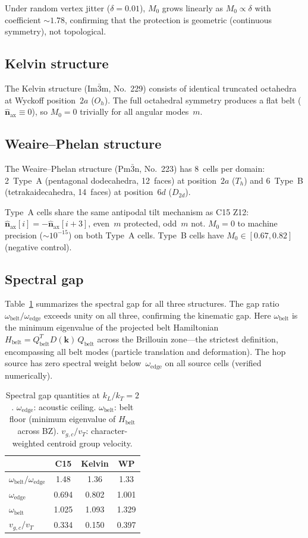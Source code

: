 \documentclass[12pt]{article}
\newcommand{\vk}{\bm{k}}
\newcommand{\vn}{\hat{\bm{n}}}
\newcommand{\oedge}{\omega_{\mathrm{edge}}}
\newcommand{\obelt}{\omega_{\mathrm{belt}}}
\begin{document}
Under random vertex jitter ($\delta = 0.01$), $M_0$ grows linearly as
$M_0 \propto \delta$ with coefficient $\sim\!1.78$, confirming that
the protection is geometric (continuous symmetry), not topological.

\subsection{Kelvin structure}
\label{sec:kelvin}

The Kelvin structure (Im$\bar{3}$m, No.~229) consists of identical
truncated octahedra at Wyckoff position~$2a$ ($O_h$).  The full
octahedral symmetry produces a flat belt ($\vn_{\mathrm{ax}} \equiv
0$), so $M_0 = 0$ trivially for all angular modes~$m$.

\subsection{Weaire--Phelan structure}
\label{sec:wp}

The Weaire--Phelan structure (Pm$\bar{3}$n, No.~223) has 8~cells per
domain: 2~Type~A (pentagonal dodecahedra, 12~faces) at
position~$2a$ ($T_h$) and 6~Type~B (tetrakaidecahedra, 14~faces) at
position~$6d$ ($D_{2d}$).

Type~A cells share the same antipodal tilt mechanism as C15 Z12:
$\vn_{\mathrm{ax}}[i] = -\vn_{\mathrm{ax}}[i+3]$, even~$m$ protected,
odd~$m$ not.  $M_0 = 0$ to machine precision ($\sim\!10^{-15}$) on
both Type~A cells.  Type~B cells have $M_0 \in [0.67, 0.82]$ (negative
control).

\subsection{Spectral gap}
\label{sec:gap}

Table~\ref{tab:gap} summarizes the spectral gap for all three
structures.  The gap ratio $\obelt / \oedge$ exceeds unity on all
three, confirming the kinematic gap.  Here $\obelt$ is the minimum
eigenvalue of the projected belt Hamiltonian $H_{\mathrm{belt}} =
Q_{\mathrm{belt}}^T D(\vk)\, Q_{\mathrm{belt}}$ across the Brillouin
zone---the strictest definition, encompassing all belt modes (particle
translation and deformation).  The hop source has zero spectral weight
below~$\oedge$ on all source cells (verified numerically).

\begin{table}[t]
\caption{Spectral gap quantities at $k_L/k_T = 2$.  $\oedge$:
acoustic ceiling.  $\obelt$: belt floor (minimum eigenvalue of
$H_{\mathrm{belt}}$ across BZ).  $v_{g,c}/v_T$: character-weighted
centroid group velocity.}
\label{tab:gap}
\begin{tabular}{lccc}
\hline\hline
 & C15 & Kelvin & WP \\
\hline
$\obelt / \oedge$ & 1.48 & 1.36 & 1.33 \\
$\oedge$ & 0.694 & 0.802 & 1.001 \\
$\obelt$ & 1.025 & 1.093 & 1.329 \\
$v_{g,c} / v_T$ & 0.334 & 0.150 & 0.397 \\
\hline\hline
\end{tabular}
\end{table}
\end{document}
